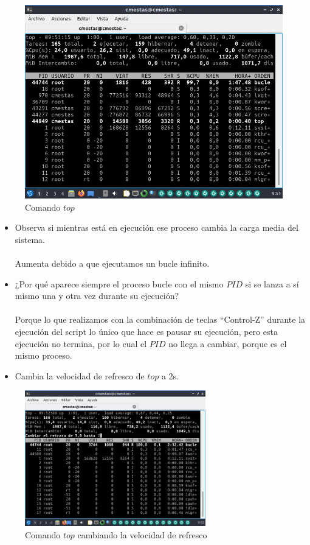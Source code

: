\documentclass[12pt]{article}
\begin{document}
\begin{figure}[h]
    \centering
    \includegraphics[width=1\textwidth]{images/screenA14.jpg}
    \caption{Comando $top$}
\end{figure}

\begin{itemize}
    \item Observa si mientras está en ejecución ese proceso cambia la carga media del sistema.
    \\
    \\
    Aumenta debido a que ejecutamos un bucle infinito.
    \item ¿Por qué aparece siempre el proceso bucle con el mismo $PID$ si se lanza a sí mismo una y otra vez durante su ejecución?
    \\
    \\
    Porque lo que realizamos con la combinación de teclas “Control-Z” durante la ejecución del script lo único que hace es pausar su ejecución, pero esta ejecución no termina, por lo cual el $PID$ no llega a cambiar, porque es el mismo proceso.
    \clearpage
    \newpage
    \item Cambia la velocidad de refresco de $top$ a 2s.
\end{itemize}

\begin{figure}[h]
    \centering
    \includegraphics[width=0.7\textwidth]{images/screenA15.jpg}
    \caption{Comando $top$ cambiando la velocidad de refresco}
\end{figure}
\end{document}

